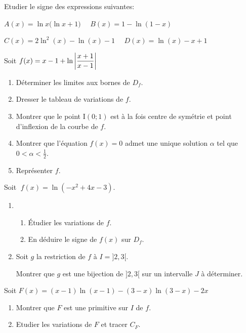 \begin{exercice}
Etudier le signe des expressions suivantes: 

\medskip
$A(x)  = \ln x\bigl(\ln x+1\bigr)\quad  $  $ B(x) = 1-\ln(1-x) $

\medskip  
$C(x)  =2\ln^2(x) -\ln (x)-1  \quad $  $ D(x)=  \ln(x)-x+1$ 
\end{exercice}


\begin{exercice}
Soit $ f(x)= x-1+ \ln\left\lvert \dfrac{x+1}{x-1} \right\rvert $
\begin{enumerate}
\item Déterminer  les limites aux bornes de  $D_{f}$.
\item Dresser le tableau de variations de $ f. $
\item Montrer que le point I$ (0;1)$ est à la fois centre de symétrie  et  point d'inflexion de la courbe de $ f$. 
\item Montrer que l'équation $ f(x)=0 $  admet une unique solution $ \alpha $ tel que $ 0<  \alpha<\frac{1}{2} $.
\item Représenter $ f. $
\end{enumerate}
\end{exercice}

\begin{exercice}
Soit  $ \; f(x)=\ln(-x^{2}+4x-3) $.
  \begin{enumerate}
\item 
\begin{enumerate}
 \item  Étudier les variations  de $ f$.
 \item En déduire le signe de $ f(x) $ sur $ D_{f} $.  
\end{enumerate}
\item Soit $ g $ la restriction de $ f  $ à  $ I=]2  ,3[ $.

 Montrer que $ g $ est une bijection de $ ]2  ,3[ $  sur un intervalle $ J $ à déterminer.
\end{enumerate}

 Soit $ F(x)=(x-1)\ln (x-1)-(3-x)\ln (3-x)-2x$  
\begin{enumerate}
\item Montrer que $ F $ est une primitive  sur $I $ de $ f $.
\item Etudier les variations de $ F $ et tracer $ C_{F} $.
\end{enumerate}
\end{exercice}




